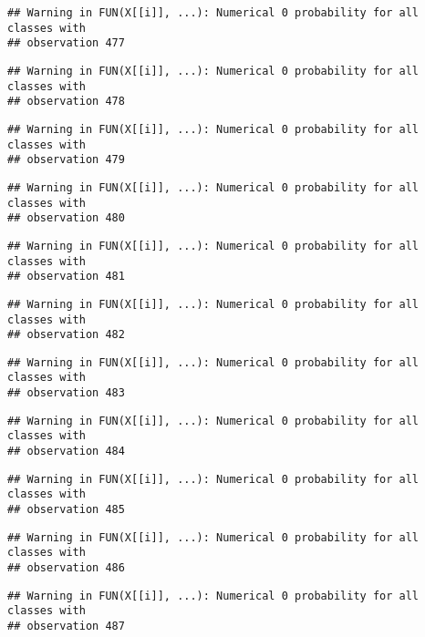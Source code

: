 \documentclass[
]{article}
\begin{document}
\begin{verbatim}
## Warning in FUN(X[[i]], ...): Numerical 0 probability for all classes with
## observation 477
\end{verbatim}

\begin{verbatim}
## Warning in FUN(X[[i]], ...): Numerical 0 probability for all classes with
## observation 478
\end{verbatim}

\begin{verbatim}
## Warning in FUN(X[[i]], ...): Numerical 0 probability for all classes with
## observation 479
\end{verbatim}

\begin{verbatim}
## Warning in FUN(X[[i]], ...): Numerical 0 probability for all classes with
## observation 480
\end{verbatim}

\begin{verbatim}
## Warning in FUN(X[[i]], ...): Numerical 0 probability for all classes with
## observation 481
\end{verbatim}

\begin{verbatim}
## Warning in FUN(X[[i]], ...): Numerical 0 probability for all classes with
## observation 482
\end{verbatim}

\begin{verbatim}
## Warning in FUN(X[[i]], ...): Numerical 0 probability for all classes with
## observation 483
\end{verbatim}

\begin{verbatim}
## Warning in FUN(X[[i]], ...): Numerical 0 probability for all classes with
## observation 484
\end{verbatim}

\begin{verbatim}
## Warning in FUN(X[[i]], ...): Numerical 0 probability for all classes with
## observation 485
\end{verbatim}

\begin{verbatim}
## Warning in FUN(X[[i]], ...): Numerical 0 probability for all classes with
## observation 486
\end{verbatim}

\begin{verbatim}
## Warning in FUN(X[[i]], ...): Numerical 0 probability for all classes with
## observation 487
\end{verbatim}
\end{document}
